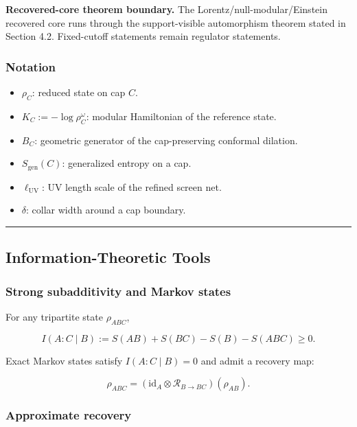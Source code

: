 \textbf{Recovered-core theorem boundary.} The Lorentz/null-modular/Einstein recovered core runs through the support-visible automorphism theorem stated in Section 4.2. Fixed-cutoff statements remain regulator statements.

\subsubsection{Notation}\label{15-notation}

\begin{itemize}
\tightlist
\item
  \(\rho_C\): reduced state on cap \(C\).
\item
  \(K_C := -\log \rho_C^{\omega}\): modular Hamiltonian of the reference state.
\item
  \(B_C\): geometric generator of the cap-preserving conformal dilation.
\item
  \(S_{\mathrm{gen}}(C)\): generalized entropy on a cap.
\item
  \(\ell_{\mathrm{UV}}\): UV length scale of the refined screen net.
\item
  \(\delta\): collar width around a cap boundary.
\end{itemize}

\begin{center}\rule{0.5\linewidth}{0.5pt}\end{center}
\subsection{Information-Theoretic Tools}\label{2-information-theoretic-tools}

\subsubsection{Strong subadditivity and Markov states}\label{21-strong-subadditivity-and-markov-states}

For any tripartite state \(\rho_{ABC}\),

\[
I(A:C \mid B) := S(AB) + S(BC) - S(B) - S(ABC) \ge 0.
\]

Exact Markov states satisfy \(I(A:C \mid B) = 0\) and admit a recovery map:

\[
\rho_{ABC} = (\mathrm{id}_A \otimes \mathcal R_{B\to BC})(\rho_{AB}).
\]

\subsubsection{Approximate recovery}\label{22-approximate-recovery}

